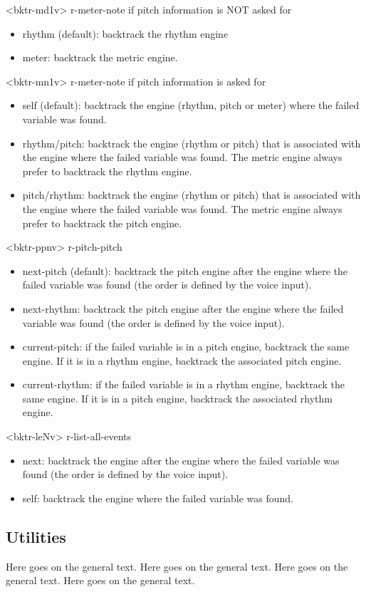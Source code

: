\begin{description}
\begin{itemize}
\end{itemize}
<bktr-md1v> r-meter-note if pitch information is NOT asked for
\begin{itemize}
\item rhythm (default): backtrack the rhythm engine
\item meter: backtrack the metric engine.
\end{itemize}
<bktr-mn1v> r-meter-note if pitch information is asked for
\begin{itemize}
\item self (default): backtrack the engine (rhythm, pitch or meter) where the failed variable was found.
\item rhythm/pitch: backtrack the engine (rhythm or pitch) that is associated with the engine where the failed variable was found. The metric engine always prefer to backtrack the rhythm engine.
\item pitch/rhythm: backtrack the engine (rhythm or pitch) that is associated with the engine where the failed variable was found. The metric engine always prefer to backtrack the pitch engine.
\end{itemize}
<bktr-ppnv> r-pitch-pitch
\begin{itemize}
\item next-pitch (default): backtrack the pitch engine after the engine where the failed variable was found (the order is defined by the voice input).
\item next-rhythm: backtrack the pitch engine after the engine where the failed variable was found (the order is defined by the voice input).
\item current-pitch: if the failed variable is in a pitch engine, backtrack the same engine. If it is in a rhythm engine, backtrack the associated pitch engine.
\item current-rhythm: if the failed variable is in a rhythm engine, backtrack the same engine. If it is in a pitch engine, backtrack the associated rhythm engine.
\end{itemize}
<bktr-leNv> r-list-all-events
\begin{itemize}
\item next:  backtrack the engine after the engine where the failed variable was found (the order is defined by the voice input).
\item self:  backtrack the engine where the failed variable was found.
\end{itemize}
\end{description}





\subsection*{Utilities}
\label{sec:org8f700b7}

Here goes on the general text. Here goes on the general text. Here
goes on the general text. Here goes on the general text.

